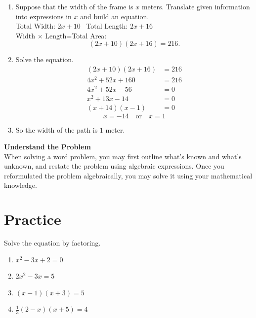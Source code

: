\documentclass[
  en,11pt]{elegantbook}
\providecommand{\tightlist}{%
  \setlength{\itemsep}{0pt}\setlength{\parskip}{0pt}}
\newcommand{\size}[2]{{\fontsize{#1}{0}\selectfont#2}}
\renewenvironment{exercise}[1][]{
    \refstepcounter{exer}
    \par\noindent
    \makebox[-3pt][r]{\color{red!90}\size{12}{\HandPencilLeft}}
	\textbf{\color{main}{\exercisename} \theexer #1}
    \rmfamily
}{\par\ignorespacesafterend}
\newenvironment{rmdtip}{
	\vspace*{0.5\baselineskip}
	\par\noindent
	\makebox[-3pt][r]{\color{red!90}\size{12}{\HandRight}\,\,}
    \begin{tcolorbox}[
    enhanced,
    title={\textbf{\color{second}Tips}},
    title style={left color=blue!10!green!20!white,right color=yellow!20!blue!20!white},
    colback=cyan!10!white,
    ]
    \sffamily
}{
    \end{tcolorbox}
    \par\ignorespacesafterend
}
\begin{document}
\begin{solution}



\begin{enumerate}
\def\labelenumi{\arabic{enumi}.}
\tightlist
\item
  Suppose that the width of the frame is \(x\) meters. Translate given information into expressions in \(x\) and build an equation.\\
  Total Width: \(2x+10\) ~Total Length: \(2x+16\)\\
  Width \(\times\) Length=Total Area:
  \[(2x+10)(2x+16)=216.\]
\item
  Solve the equation.
  \[
   \begin{aligned}
       (2x+10)(2x+16)&=216\\
       4x^2+52x+160&=216\\
       4x^2+52x-56&=0\\
       x^2+13x-14&=0\\
       (x+14)(x-1)&=0
   \end{aligned}
   \]
  \[
   x = -14\quad \text{or}\quad x = 1
   \]
\item
  So the width of the path is \(1\) meter.
\end{enumerate}

\end{solution}

\begin{rmdtip}

\textbf{Understand the Problem}\\
When solving a word problem, you may first outline what's known and what's unknown, and restate the problem using algebraic expressions. Once you reformulated the problem algebraically, you may solve it using your mathematical knowledge.

\end{rmdtip}

\newpage

\hypertarget{practice-4}{%
\section{Practice}\label{practice-4}}

\begin{exercise}

Solve the equation by factoring.

\begin{enumerate}
\def\labelenumi{\arabic{enumi}.}
\tightlist
\item
  \(x^2-3x+2=0\)
\item
  \(2x^2-3x=5\)
\item
  \((x-1)(x+3)=5\)
\item
  \(\frac13(2-x)(x+5)=4\)
\end{enumerate}

\end{exercise}
\end{document}
